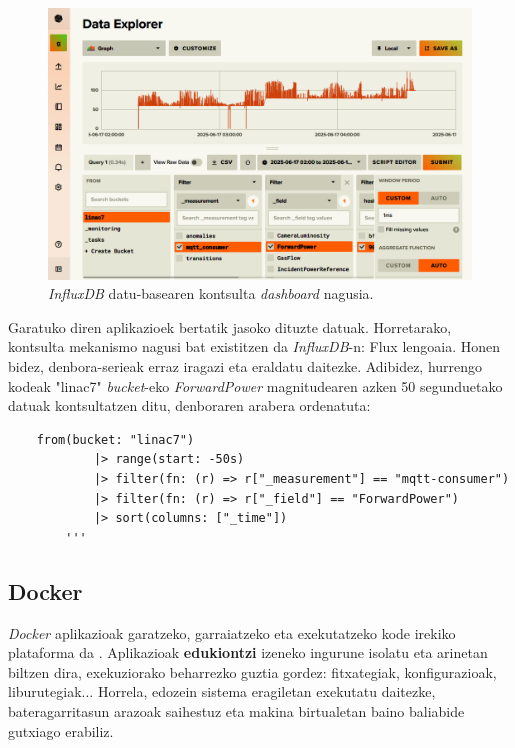\documentclass[12pt]{article}
\numberwithin{figure}{section}
\numberwithin{equation}{section}
\begin{document}
\begin{figure}[h]
    \centering
    \includegraphics[width=\linewidth]{2 - Ingurunea/influxdb.png}
    \caption{\textit{InfluxDB} datu-basearen kontsulta \textit{dashboard} nagusia.}
    \label{fig:influx_dashboard}
\end{figure}
\newpage
Garatuko diren aplikazioek bertatik jasoko dituzte datuak. Horretarako, kontsulta mekanismo nagusi bat existitzen da \textit{InfluxDB}-n: Flux lengoaia. Honen bidez, denbora\hyp{}serieak erraz iragazi eta eraldatu daitezke. Adibidez, hurrengo kodeak "linac7" \textit{bucket}\hyp{}eko \textit{ForwardPower} magnitudearen azken 50 segunduetako datuak kontsultatzen ditu, denboraren arabera ordenatuta:
\begin{verbatim}
    from(bucket: "linac7")
            |> range(start: -50s)
            |> filter(fn: (r) => r["_measurement"] == "mqtt-consumer")
            |> filter(fn: (r) => r["_field"] == "ForwardPower")
            |> sort(columns: ["_time"])
        '''
\end{verbatim}
\subsection{Docker}
\label{sec:docker}
\textit{Docker} aplikazioak garatzeko, garraiatzeko eta exekutatzeko kode irekiko plataforma da \cite{noauthor_what_2025}. Aplikazioak \textbf{edukiontzi} izeneko ingurune isolatu eta arinetan biltzen dira, exekuziorako beharrezko guztia gordez: fitxategiak, konfigurazioak, liburutegiak... Horrela, edozein sistema eragiletan exekutatu daitezke, bateragarritasun arazoak saihestuz eta makina birtualetan baino baliabide gutxiago erabiliz.\\
\end{document}
